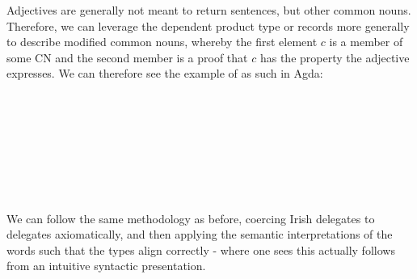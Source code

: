 Adjectives are generally not meant to return sentences, but other common
nouns. Therefore, we can leverage the dependent product type or records more
generally to describe modified common nouns, whereby the first element $c$ is a
member of some CN and the second member is a proof that $c$ has the property the
adjective expresses. We can therefore see the example of  as
such in Agda:

\begin{code}[hide]%
\>[0]\AgdaSpace{}%
\AgdaSymbol{:}\AgdaSpace{}%
\AgdaSpace{}%
\AgdaSpace{}%
\<%
\\
\>[0]\AgdaSpace{}%
\AgdaSpace{}%
\AgdaSymbol{=}\AgdaSpace{}%
\AgdaSpace{}%
\AgdaSymbol{(}\AgdaSpace{}%
\AgdaSymbol{(}\AgdaSpace{}%
\AgdaSymbol{))}\<%
\end{code}
\begin{code}%
\>[0]\AgdaSpace{}%
\AgdaSpace{}%
\AgdaSymbol{:}\AgdaSpace{}%
\AgdaSpace{}%
\<%
\\
\>[0][@{}l@{\AgdaIndent{0}}]%
\>[2]\<%
\\
\>[2][@{}l@{\AgdaIndent{0}}]%
\>[4]\<%
\\
%
\>[2]\<%
\\
\>[2][@{}l@{\AgdaIndent{0}}]%
\>[4]\AgdaSpace{}%
\AgdaSymbol{:}\AgdaSpace{}%
\<%
\\
%
\>[4]\AgdaSpace{}%
\AgdaSymbol{:}\AgdaSpace{}%
\AgdaSpace{}%
\AgdaOperator{\AgdaFunction{\$}}\AgdaSpace{}%
\<%
\end{code}

We can follow the same methodology as before, coercing Irish delegates to
delegates axiomatically, and then applying the semantic interpretations of the
words such that the types align correctly - where one sees this actually follows
from an intuitive syntactic presentation.

